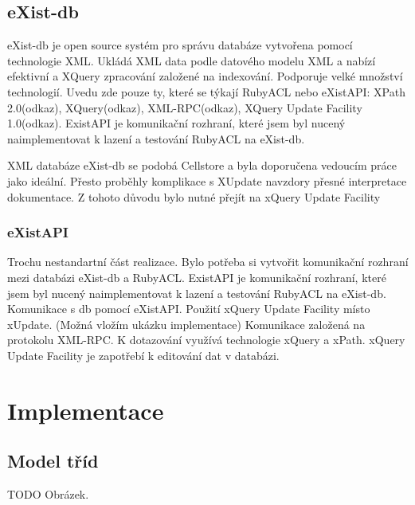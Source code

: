 \documentclass[11pt,twoside,a4paper]{book}
\begin{document}
\subsection{eXist-db}
eXist-db je open source systém pro správu databáze vytvořena pomocí technologie XML. Ukládá XML data podle datového modelu XML a nabízí efektivní a XQuery zpracování založené na indexování. Podporuje velké množství technologií. Uvedu zde pouze ty, které se týkají RubyACL nebo eXistAPI: XPath 2.0(odkaz), XQuery(odkaz), XML-RPC(odkaz), XQuery Update Facility 1.0(odkaz). ExistAPI je komunikační rozhraní, které jsem byl nucený naimplementovat k lazení a testování RubyACL na eXist-db.

XML databáze eXist-db se podobá Cellstore a byla doporučena vedoucím práce jako ideální. Přesto proběhly komplikace s XUpdate navzdory přesné interpretace dokumentace. Z tohoto důvodu bylo nutné přejít na xQuery Update Facility


\subsubsection{eXistAPI}

Trochu nestandartní část realizace. Bylo potřeba si vytvořit komunikační rozhraní mezi databázi eXist-db a RubyACL.
ExistAPI je komunikační rozhraní, které jsem byl nucený naimplementovat k lazení a testování RubyACL na eXist-db.
Komunikace s db pomocí eXistAPI.
Použití xQuery Update Facility místo xUpdate. (Možná vložím ukázku implementace)
Komunikace založená na protokolu XML-RPC. K dotazování využívá technologie xQuery a xPath. xQuery Update Facility je zapotřebí k editování dat v databázi.

\section{Implementace}
\subsection{Model tříd}
TODO Obrázek.
\end{document}

